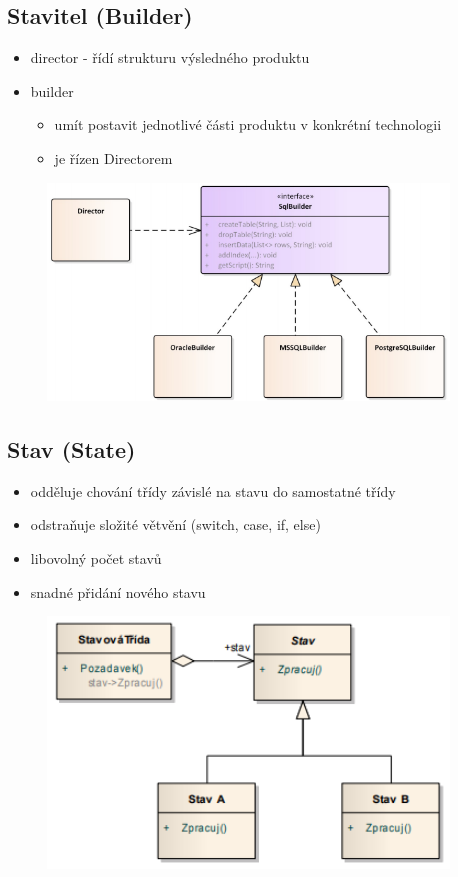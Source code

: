 \documentclass{szzclass}
\begin{document}
\subsection{Stavitel (Builder)}
\begin{itemize}
    \item director - řídí strukturu výsledného produktu
    \item builder
    \begin{itemize}
        \item umít postavit jednotlivé části produktu v konkrétní technologii
        \item je řízen Directorem
    \end{itemize}
\end{itemize}
\begin{figure}[h!]
    \includegraphics[width=0.95\textwidth]{topics/bi-wsi-si-19/images/builder.png}
\end{figure}
\newpage
\subsection{Stav (State)}
\begin{itemize}
    \item odděluje chování třídy závislé na stavu do samostatné třídy
    \item odstraňuje složité větvění (switch, case, if, else)
    \item libovolný počet stavů
    \item snadné přidání nového stavu
\end{itemize}
\begin{figure}[h!]
    \includegraphics[width=0.95\textwidth]{topics/bi-wsi-si-19/images/state.png}
\end{figure}
\end{document}
